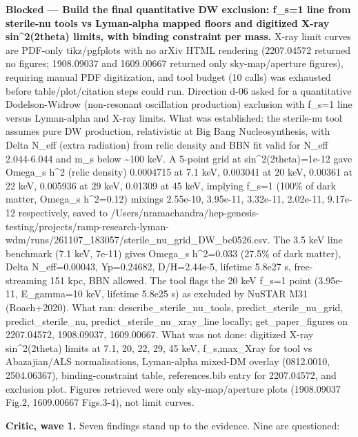 \documentclass[11pt,a4paper]{article}
\begin{document}
\textbf{Blocked --- Build the final quantitative DW exclusion: f\_s=1 line from sterile-nu tools vs Lyman-alpha mapped floors and digitized X-ray sin\textasciicircum{}2(2theta) limits, with binding constraint per mass.} X-ray limit curves are PDF-only tikz/pgfplots with no arXiv HTML rendering (2207.04572 returned no figures; 1908.09037 and 1609.00667 returned only sky-map/aperture figures), requiring manual PDF digitization, and tool budget (10 calls) was exhausted before table/plot/citation steps could run. Direction d-06 asked for a quantitative Dodelson-Widrow (non-resonant oscillation production) exclusion with f\_s=1 line versus Lyman-alpha and X-ray limits. What was established: the sterile-nu tool assumes pure DW production, relativistic at Big Bang Nucleosynthesis, with Delta N\_eff (extra radiation) from relic density and BBN fit valid for N\_eff 2.044-6.044 and m\_s below \textasciitilde{}100 keV. A 5-point grid at sin\textasciicircum{}2(2theta)=1e-12 gave Omega\_s h\textasciicircum{}2 (relic density) 0.0004715 at 7.1 keV, 0.003041 at 20 keV, 0.00361 at 22 keV, 0.005936 at 29 keV, 0.01309 at 45 keV, implying f\_s=1 (100\% of dark matter, Omega\_s h\textasciicircum{}2=0.12) mixings 2.55e-10, 3.95e-11, 3.32e-11, 2.02e-11, 9.17e-12 respectively, saved to /Users/nramachandra/hep-genesis-testing/projects/ramp-research-lyman-wdm/runs/261107\_183057/sterile\_nu\_grid\_DW\_bc0526.csv. The 3.5 keV line benchmark (7.1 keV, 7e-11) gives Omega\_s h\textasciicircum{}2=0.033 (27.5\% of dark matter), Delta N\_eff=0.00043, Yp=0.24682, D/H=2.44e-5, lifetime 5.8e27 s, free-streaming 151 kpc, BBN allowed. The tool flags the 20 keV f\_s=1 point (3.95e-11, E\_gamma=10 keV, lifetime 5.8e25 s) as excluded by NuSTAR M31 (Roach+2020). What ran: describe\_sterile\_nu\_tools, predict\_sterile\_nu\_grid, predict\_sterile\_nu, predict\_sterile\_nu\_xray\_line locally; get\_paper\_figures on 2207.04572, 1908.09037, 1609.00667. What was not done: digitized X-ray sin\textasciicircum{}2(2theta) limits at 7.1, 20, 22, 29, 45 keV, f\_s,max\_Xray for tool vs Abazajian/ALS normalisations, Lyman-alpha mixed-DM overlay (0812.0010, 2504.06367), binding-constraint table, references.bib entry for 2207.04572, and exclusion plot. Figures retrieved were only sky-map/aperture plots (1908.09037 Fig.2, 1609.00667 Figs.3-4), not limit curves.

\textbf{Critic, wave 1.} Seven findings stand up to the evidence. Nine are questioned:
\end{document}
